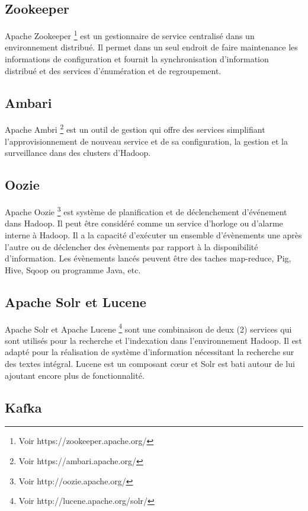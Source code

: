 \documentclass[12pt,french]{book}
\begin{document}
\subsection{Zookeeper}

Apache Zookeeper \footnote{Voir https://zookeeper.apache.org/} est un gestionnaire de service centralisé dans un environnement distribué. Il permet dans un seul endroit de faire maintenance les informations de configuration et fournit la synchronisation d’information distribué et des services d’énumération et de regroupement.   

\subsection{Ambari}

Apache Ambri \footnote{Voir https://ambari.apache.org/} est un outil de gestion qui offre des services simplifiant l’approvisionnement de nouveau service et de sa configuration, la gestion et la surveillance dans des clusters d’Hadoop.

\subsection{Oozie}

Apache Oozie \footnote{Voir http://oozie.apache.org/} est système de planification et de déclenchement d’événement dans Hadoop. Il peut être considéré comme un service d’horloge ou d’alarme interne à Hadoop. Il a la capacité d’exécuter un ensemble d’évènements une après l’autre ou de déclencher des évènements par rapport à la disponibilité d’information. Les évènements lancés peuvent être des taches map-reduce, Pig, Hive, Sqoop ou programme Java, etc. 

\subsection{Apache Solr et Lucene}

Apache Solr et Apache Lucene \footnote{Voir http://lucene.apache.org/solr/} sont une combinaison de deux (2) services qui sont utilisés pour la recherche et l’indexation dans l’environnement Hadoop.  Il est adapté pour la réalisation de système d’information nécessitant la recherche sur des textes intégral. Lucene est un composant cœur et Solr est bati autour de lui ajoutant encore plus de fonctionnalité.  

\subsection{Kafka}
\end{document}
